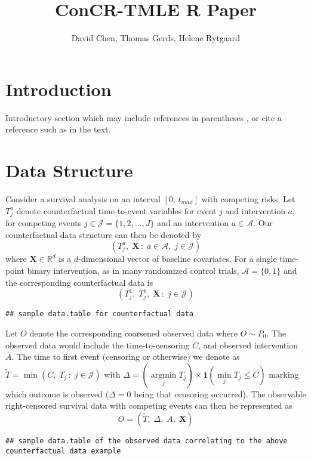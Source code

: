 \documentclass{article}
\author{David Chen, Thomas Gerds, Helene Rytgaard}
\date{}
\title{ConCR-TMLE R Paper}
\newcommand{\1}{\ensuremath{\mathbf{1}}}
\DeclareMathOperator*{\argmin}{argmin}
\newcommand{\T}{\ensuremath{\widetilde{T}}}
\newcommand{\X}{\ensuremath{\mathbf{X}}}
\begin{document}
\maketitle
{}

\section{Introduction}
Introductory section which may include references in parentheses
\citep{R}, or cite a reference such as \citet{R} in the text. 

\section{Data Structure}
Consider a survival analysis on an interval $[0,\,t_{max}]$ with competing risks. Let $T^a_j$ denote counterfactual time-to-event variables for event $j$ and intervention $a$, for competing events $j \in \mathcal{J} = \{1, 2, \dots, J\}$ and an intervention $a \in \mathcal{A}$. Our counterfactual data structure can then be denoted by
\[(T^a_j,\;\X\,:\;a\in\mathcal{A},\;j\in\mathcal{J})\]
where $\X \in \mathbb{R}^d$ is a $d$-dimensional vector of baseline covariates. For a single time-point binary intervention, as in many randomized control trials, $\mathcal{A} = \{0, 1\}$ and the corresponding counterfactual data is 
\[ (T^1_j,\; T^0_j,\;\X\,: \;j\in\mathcal{J})\]

\begin{lstlisting}
## sample data.table for counterfactual data
\end{lstlisting}

\noindent Let $O$ denote the corresponding coarsened observed data where $O \sim P_0$. The observed data would include the time-to-censoring $C$, and observed intervention $A$. The time to first event (censoring or otherwise) we denote as $\T = \min(C,\; T_j\,: \; j \in \mathcal{J})$ with $\Delta = (\argmin\limits_j T_j) \times \1(\min\limits_j T_j \leq C)$ marking which outcome is observed ($\Delta = 0$ being that censoring occurred). The observable right-censored survival data with competing events can then be represented as 
\[O = (\T,\;\Delta,\;A,\;\X)\]

\begin{lstlisting}
## sample data.table of the observed data correlating to the above counterfactual data example
\end{lstlisting}
\end{document}
